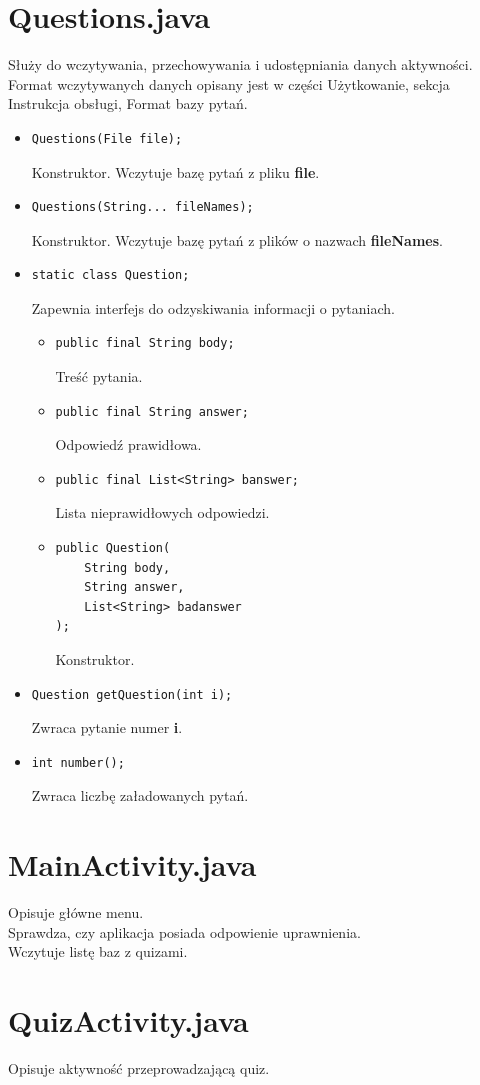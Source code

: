 \documentclass[12pt, a4paper]{article}
\begin{document}
\section{Questions.java}
Służy do wczytywania, przechowywania i udostępniania danych aktywności.\\
Format wczytywanych danych opisany jest w części Użytkowanie, sekcja Instrukcja obsługi, Format bazy pytań.
\begin{itemize}
\item\begin{lstlisting}
Questions(File file);
\end{lstlisting}
Konstruktor. Wczytuje bazę pytań z pliku \textbf{file}.
\item\begin{lstlisting}
Questions(String... fileNames);
\end{lstlisting}
Konstruktor. Wczytuje bazę pytań z plików o nazwach \textbf{fileNames}.
\item\begin{lstlisting}
static class Question;
\end{lstlisting}
Zapewnia interfejs do odzyskiwania informacji o pytaniach.
\begin{itemize}
\item\begin{lstlisting}
public final String body;
\end{lstlisting}
Treść pytania.
\item\begin{lstlisting}
public final String answer;
\end{lstlisting}
Odpowiedź prawidłowa.
\item\begin{lstlisting}
public final List<String> banswer;
\end{lstlisting}
Lista nieprawidłowych odpowiedzi.
\item\begin{lstlisting}
public Question(
	String body,
	String answer,
	List<String> badanswer
);
\end{lstlisting}
Konstruktor.
\end{itemize}

\item\begin{lstlisting}
Question getQuestion(int i);
\end{lstlisting}
Zwraca pytanie numer \textbf{i}.
\item\begin{lstlisting}
int number();
\end{lstlisting}
Zwraca liczbę załadowanych pytań.
\end{itemize}

\section{MainActivity.java}
Opisuje główne menu.\\
Sprawdza, czy aplikacja posiada odpowienie uprawnienia.\\
Wczytuje listę baz z quizami.\\

\section{QuizActivity.java}
Opisuje aktywność przeprowadzającą quiz.\\
\end{document}
